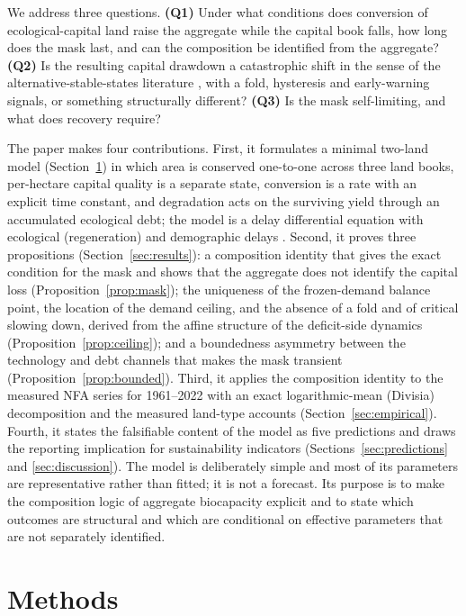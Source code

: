 \documentclass[preprint,12pt,authoryear]{elsarticle}
\begin{document}
We address three questions. \textbf{(Q1)} Under what conditions does conversion of ecological-capital land raise the aggregate while the capital book falls, how long does the mask last, and can the composition be identified from the aggregate? \textbf{(Q2)} Is the resulting capital drawdown a catastrophic shift in the sense of the alternative-stable-states literature \citep{Scheffer2001}, with a fold, hysteresis and early-warning signals, or something structurally different? \textbf{(Q3)} Is the mask self-limiting, and what does recovery require?

The paper makes four contributions. First, it formulates a minimal two-land model (Section~\ref{sec:model}) in which area is conserved one-to-one across three land books, per-hectare capital quality is a separate state, conversion is a rate with an explicit time constant, and degradation acts on the surviving yield through an accumulated ecological debt; the model is a delay differential equation with ecological (regeneration) and demographic delays \citep{Kuang1993,Hutchinson1948}. Second, it proves three propositions (Section~\ref{sec:results}): a composition identity that gives the exact condition for the mask and shows that the aggregate does not identify the capital loss (Proposition~\ref{prop:mask}); the uniqueness of the frozen-demand balance point, the location of the demand ceiling, and the absence of a fold and of critical slowing down, derived from the affine structure of the deficit-side dynamics (Proposition~\ref{prop:ceiling}); and a boundedness asymmetry between the technology and debt channels that makes the mask transient (Proposition~\ref{prop:bounded}). Third, it applies the composition identity to the measured NFA series for 1961--2022 with an exact logarithmic-mean (Divisia) decomposition and the measured land-type accounts (Section~\ref{sec:empirical}). Fourth, it states the falsifiable content of the model as five predictions and draws the reporting implication for sustainability indicators (Sections~\ref{sec:predictions} and \ref{sec:discussion}). The model is deliberately simple and most of its parameters are representative rather than fitted; it is not a forecast. Its purpose is to make the composition logic of aggregate biocapacity explicit and to state which outcomes are structural and which are conditional on effective parameters that are not separately identified.
\section{Methods}\label{sec:model}
\end{document}
